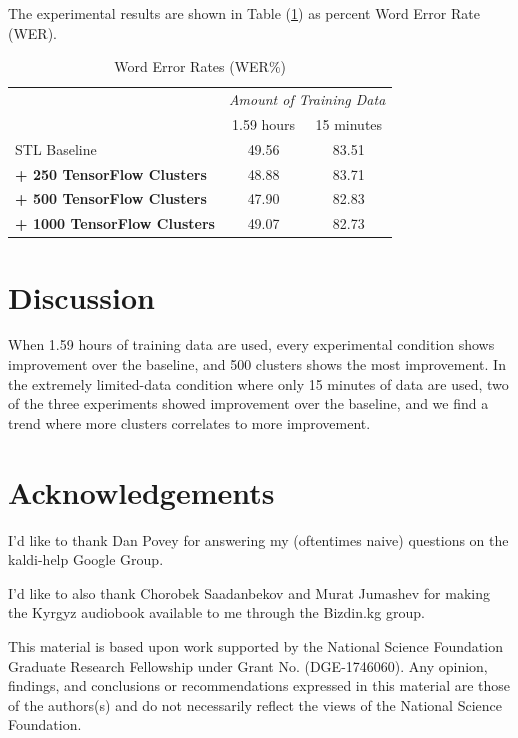 \documentclass[a4paper]{article}
\begin{document}
The experimental results are shown in Table (\ref{tab:results}) as percent Word Error Rate (WER).


\begin{table}[!htbp]
  \centering
  \caption{Word Error Rates (WER\%)}
    \label{tab:results}
  \begin{adjustbox}{width=.4\textwidth}
    \begin{tabular}{lcc}
      \toprule
      & \multicolumn{2}{c}{ \textit{Amount of Training Data}}\\
      & 1.59 hours & 15 minutes \\
      \midrule
      STL Baseline                              & 49.56       &  83.51 \\
      \textbf{+ 250 TensorFlow Clusters}        & 48.88            & 83.71 \\
      \textbf{+ 500 TensorFlow Clusters}        & 47.90       & 82.83 \\
      \textbf{+ 1000 TensorFlow Clusters}        & 49.07       & 82.73 \\
      \midrule
      \bottomrule
    \end{tabular}
  \end{adjustbox}
\end{table}




\section{Discussion}


When 1.59 hours of training data are used, every experimental condition shows improvement over the baseline, and 500 clusters shows the most improvement. In the extremely limited-data condition where only 15 minutes of data are used, two of the three experiments showed improvement over the baseline, and we find a trend where more clusters correlates to more improvement.








\section{Acknowledgements}

I'd like to thank Dan Povey for answering my (oftentimes naive) questions on the kaldi-help Google Group.

I'd like to also thank Chorobek Saadanbekov and Murat Jumashev for making the Kyrgyz audiobook available to me through the Bizdin.kg group.

This material is based upon work supported by the National Science Foundation Graduate Research Fellowship under Grant No. (DGE-1746060). Any opinion, findings, and conclusions or recommendations expressed in this material are those of the authors(s) and do not necessarily reflect the views of the National Science Foundation.





\newpage



\end{document}
